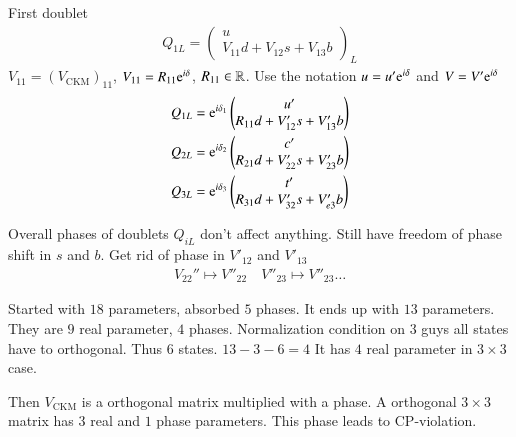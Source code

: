 First doublet
\begin{align}
   Q_{1L} = \begin{pmatrix}  u \\ V_{11}d + V_{12} s + V_{13} b \end{pmatrix}_L
\end{align}
$V_{11} = (V_\text{CKM})_{11}$, $V_{11} = R_{11} \mathrm{e}^{i\delta}$, $R_{11} \in \mathbb{R}$. Use the notation $u = u' \mathrm{e}^{i\delta}$ and $V = V' \mathrm{e}^{i\delta}$
\begin{align*}
   Q_{1L} &= \mathrm{e}^{i\delta_1} \begin{pmatrix} u' \\ R_{11}d + V'_{12} s + V'_{13} b \end{pmatrix} \\
   Q_{2L} &= \mathrm{e}^{i\delta_2} \begin{pmatrix} c' \\ R_{21}d + V'_{22} s + V'_{23} b \end{pmatrix} \\
   Q_{3L} &= \mathrm{e}^{i\delta_3} \begin{pmatrix} t' \\ R_{31}d + V'_{32} s + V'_{e3} b \end{pmatrix}
\end{align*}

Overall phases of doublets $Q_{iL}$ don't affect anything. Still have freedom of phase shift in $s$ and $b$. Get rid of phase in $V'_{12}$ and $V'_{13}$
\begin{align*}
   V_{22}'' \mapsto V''_{22} \quad V''_{23} \mapsto V''_{23} \dots
\end{align*}

Started with $18$ parameters, absorbed $5$ phases. It ends up with $13$ parameters. They are $9$ real parameter, $4$ phases. Normalization condition on $3$ guys all states have to orthogonal. Thus $6$ states. $13 - 3 - 6 = 4$ It has $4$ real parameter in $3 \times 3$ case.

Then $V_\text{CKM}$ is a orthogonal matrix multiplied with a phase. A orthogonal $3 \times 3$ matrix has $3$ real and $1$ phase parameters. This phase leads to CP-violation.

